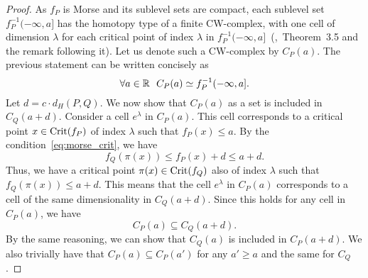 \begin{proof}
    As $f_P$ is Morse and its sublevel sets are compact, each sublevel set
    $f_P^{-1}(-\infty, a]$ has the homotopy type of a finite CW-complex, with
    one cell of dimension $\lambda$ for each critical point of index $\lambda$
    in $f_P^{-1}(-\infty, a]$~(\cite{milnor1963morse},~Theorem~3.5 and the
    remark following it). Let us denote such a CW-complex by $C_P(a)$. The
    previous statement can be written concisely as
    \begin{equation}
        \forall a \in \mathbb{R} \ \  C_P(a) \simeq f_P^{-1}(-\infty, a].
    \end{equation}
    Let $d = c \cdot d_H(P, Q)$.
    We now show that $C_P(a)$ as a set is included in $C_Q(a + d)$.
    Consider a cell $e^\lambda$ in $C_P(a)$. This cell corresponds to a critical
    point $x \in \operatorname{Crit}(f_P)$ of index $\lambda$ such that $f_P(x) \leq a$.
    By the condition~\eqref{eq:morse_crit}, we have
    \begin{equation}
        f_Q(\pi(x)) \leq f_P(x) + d \leq a + d.
    \end{equation}
    Thus, we have a critical point $\pi(x) \in \operatorname{Crit}(f_Q)$ also of index
    $\lambda$ such that $f_Q(\pi(x)) \leq a + d$. This means that
    the cell $e^\lambda$ in $C_P(a)$ corresponds to a cell of the same dimensionality in
    $C_Q(a + d)$. Since this holds for any cell in $C_P(a)$, we
    have \begin{equation}
        C_P(a) \subseteq C_Q(a + d).
    \end{equation}
    By the same reasoning, we can show that $C_Q(a)$ is included in
    $C_P(a + d)$. We also trivially have that
    $C_P(a) \subseteq C_P(a')$ for any $a' \geq a$ and the same for $C_Q$.


\end{proof}
